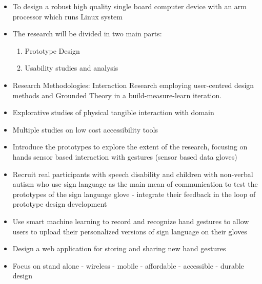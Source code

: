 \begin{itemize}
    \item To design a robust high quality single board computer device with an arm processor which runs Linux system 
    \item The research will be divided in two main parts: 
    \begin{enumerate}
        \item Prototype Design
        \item Usability studies and analysis
    \end{enumerate}
    \item Research Methodologies: Interaction Research employing user-centred design methods and Grounded Theory in a build-measure-learn iteration.
    \item Explorative studies of physical tangible interaction with domain
    \item Multiple studies on low cost accessibility tools
    \item Introduce the prototypes to explore the extent of the research, focusing on hands sensor based interaction with gestures (sensor based data gloves)
    \item Recruit real participants with speech disability and children with non-verbal autism who use sign language as the main mean of communication to test the prototypes of the sign language glove - integrate their feedback in the loop of prototype design development 
    \item Use smart machine learning to record and recognize hand gestures to allow users to upload their personalized versions of sign language on their gloves 
    \item Design a web application for storing and sharing new hand gestures 
    \item Focus on stand alone - wireless - mobile - affordable - accessible - durable design 
\end{itemize}